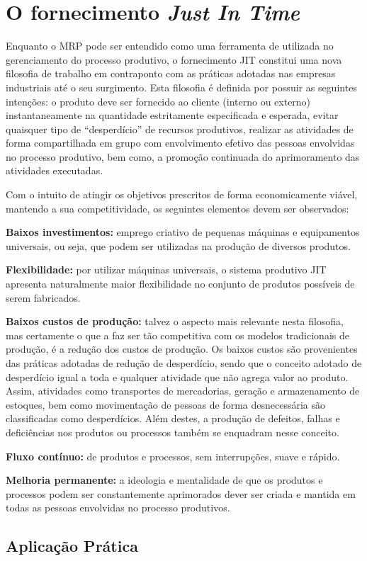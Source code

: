 \chapter{O fornecimento \textit{Just In Time}}
\label{chap:fornecimento_just_in_time}

Enquanto o \ac{MRP} pode ser entendido como uma ferramenta de utilizada no gerenciamento do processo produtivo, o fornecimento \ac{JIT} constitui uma nova filosofia de trabalho em contraponto com as práticas adotadas nas empresas industriais até o seu surgimento. Esta filosofia é definida por possuir as seguintes intenções: o produto deve ser fornecido ao cliente (interno ou externo) instantaneamente na quantidade estritamente especificada e esperada, evitar quaisquer tipo de ``desperdício'' de recursos produtivos, realizar as atividades de forma compartilhada em grupo com envolvimento efetivo das pessoas envolvidas no processo produtivo, bem como, a promoção continuada do aprimoramento das atividades executadas.

Com o intuito de atingir os objetivos prescritos de forma economicamente viável, mantendo a sua competitividade, os seguintes elementos devem ser observados:

\textbf{Baixos investimentos:} emprego criativo de pequenas máquinas e equipamentos universais, ou seja, que podem ser utilizadas na produção de diversos produtos.

\textbf{Flexibilidade:} por utilizar máquinas universais, o sistema produtivo \ac{JIT} apresenta naturalmente maior flexibilidade no conjunto de produtos possíveis de serem fabricados.

\textbf{Baixos custos de produção:} talvez o aspecto mais relevante nesta filosofia, mas certamente o que a faz ser tão competitiva com os modelos tradicionais de produção, é a redução dos custos de produção. Os baixos custos são provenientes das práticas adotadas de redução de desperdício, sendo que o conceito adotado de desperdício igual a toda e qualquer atividade que não agrega valor ao produto. Assim, atividades como transportes de mercadorias, geração e armazenamento de estoques, bem como movimentação de pessoas de forma desnecessária são classificadas como desperdícios. Além destes, a produção de defeitos, falhas e deficiências nos produtos ou processos também se enquadram nesse conceito.

\textbf{Fluxo contínuo:} de produtos e processos, sem interrupções, suave e rápido.

\textbf{Melhoria permanente:} a ideologia e mentalidade de que os produtos e processos podem ser constantemente aprimorados dever ser criada e mantida em todas as pessoas envolvidas no processo produtivos.

\section{Aplicação Prática}
\label{sec:fonercimento_just_in_time_aplicacao}
